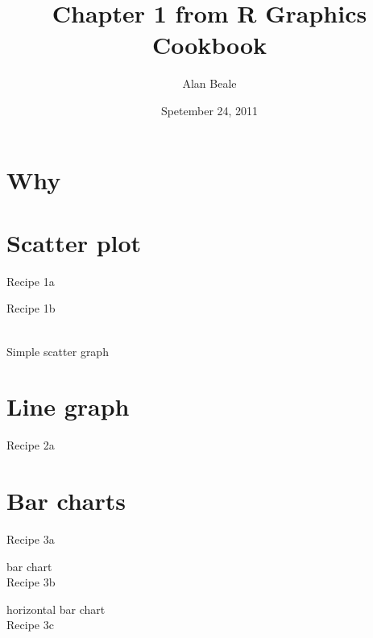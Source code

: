\documentclass[10pt]{article}
\title{Chapter 1 from R Graphics Cookbook }
\author{Alan Beale}
\date{Spetember 24, 2011}
\newcommand{\placeRecipe}[1]{\bigskip \noindent  \bigskip}
\newcommand{\testRecipe}[1]{\begin{figure}[!htb] \centering  \end{figure}}
\begin{document}
\sffamily 
\maketitle

\section{Why}

\section{Scatter plot}
\Large{Recipe 1a}
\placeRecipe{recipe1a}

\Large{Recipe 1b}
\testRecipe{recipe1b}
\\Simple scatter graph 
\clearpage
\section{Line graph}
\Large{Recipe 2a}
\testRecipe{recipe2a} 
\clearpage
\section{ Bar charts}
\Large{Recipe 3a}
\testRecipe{recipe3a}
bar chart\\
\Large{Recipe 3b}
\testRecipe{recipe3b}
horizontal bar chart\\
\Large{Recipe 3c}
\testRecipe{recipe3c}
\placeRecipe{recipe3d}
\end{document}
